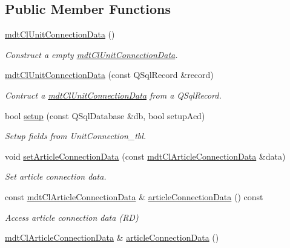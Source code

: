 \subsection*{Public Member Functions}
\begin{DoxyCompactItemize}
\item 
\hyperlink{classmdt_cl_unit_connection_data_a8740f35bea3cf38c7c47338c2b065081}{mdt\-Cl\-Unit\-Connection\-Data} ()
\begin{DoxyCompactList}\small\item\em Construct a empty \hyperlink{classmdt_cl_unit_connection_data}{mdt\-Cl\-Unit\-Connection\-Data}. \end{DoxyCompactList}\item 
\hyperlink{classmdt_cl_unit_connection_data_a6922e05be582dd95de82bfe4dd8434f9}{mdt\-Cl\-Unit\-Connection\-Data} (const Q\-Sql\-Record \&record)
\begin{DoxyCompactList}\small\item\em Contruct a \hyperlink{classmdt_cl_unit_connection_data}{mdt\-Cl\-Unit\-Connection\-Data} from a Q\-Sql\-Record. \end{DoxyCompactList}\item 
bool \hyperlink{classmdt_cl_unit_connection_data_a776b3eb79ef6397b12b5cabe37c89b13}{setup} (const Q\-Sql\-Database \&db, bool setup\-Acd)
\begin{DoxyCompactList}\small\item\em Setup fields from Unit\-Connection\-\_\-tbl. \end{DoxyCompactList}\item 
void \hyperlink{classmdt_cl_unit_connection_data_a1ee413dcf0cdb36fb029918c0e0742ef}{set\-Article\-Connection\-Data} (const \hyperlink{classmdt_cl_article_connection_data}{mdt\-Cl\-Article\-Connection\-Data} \&data)
\begin{DoxyCompactList}\small\item\em Set article connection data. \end{DoxyCompactList}\item 
const \hyperlink{classmdt_cl_article_connection_data}{mdt\-Cl\-Article\-Connection\-Data} \& \hyperlink{classmdt_cl_unit_connection_data_a28cb03789cf3ebfa70e5d971fa0e375b}{article\-Connection\-Data} () const 
\begin{DoxyCompactList}\small\item\em Access article connection data (R\-D) \end{DoxyCompactList}\item 
\hyperlink{classmdt_cl_article_connection_data}{mdt\-Cl\-Article\-Connection\-Data} \& \hyperlink{classmdt_cl_unit_connection_data_a458382048d72c000f140a156c80aec56}{article\-Connection\-Data} ()

\end{DoxyCompactItemize}
